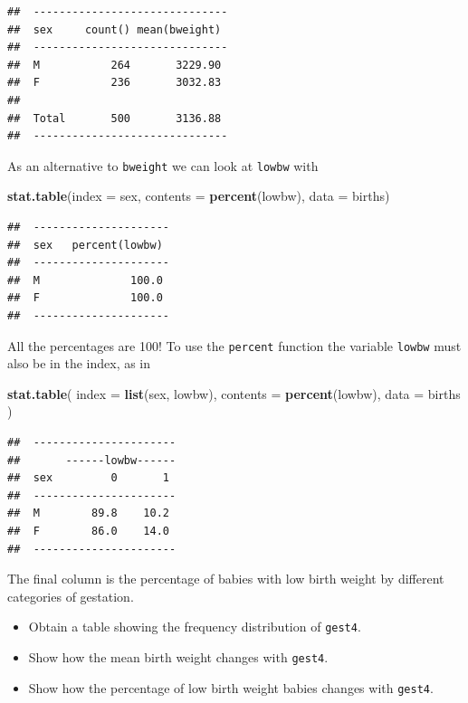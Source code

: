 \documentclass[
]{book}
\newenvironment{Shaded}{\begin{snugshade}}{\end{snugshade}}
\newcommand{\AttributeTok}[1]{\textcolor[rgb]{0.13,0.29,0.53}{#1}}
\newcommand{\FunctionTok}[1]{\textcolor[rgb]{0.13,0.29,0.53}{\textbf{#1}}}
\newcommand{\NormalTok}[1]{#1}
\providecommand{\tightlist}{%
  \setlength{\itemsep}{0pt}\setlength{\parskip}{0pt}}
\theoremstyle{definition}
\theoremstyle{definition}
\theoremstyle{definition}
\theoremstyle{definition}
\theoremstyle{remark}
\begin{document}
\begin{verbatim}
##  ------------------------------ 
##  sex     count() mean(bweight)  
##  ------------------------------ 
##  M           264       3229.90  
##  F           236       3032.83  
##                                 
##  Total       500       3136.88  
##  ------------------------------
\end{verbatim}

As an alternative to \texttt{bweight} we can look at \texttt{lowbw} with

\begin{Shaded}
\begin{Highlighting}[]
\FunctionTok{stat.table}\NormalTok{(}\AttributeTok{index =}\NormalTok{ sex, }\AttributeTok{contents =} \FunctionTok{percent}\NormalTok{(lowbw), }\AttributeTok{data =}\NormalTok{ births)}
\end{Highlighting}
\end{Shaded}

\begin{verbatim}
##  --------------------- 
##  sex   percent(lowbw)  
##  --------------------- 
##  M              100.0  
##  F              100.0  
##  ---------------------
\end{verbatim}

All the percentages are 100! To use the \texttt{percent} function the variable \texttt{lowbw} must also be in the index, as in

\begin{Shaded}
\begin{Highlighting}[]
\FunctionTok{stat.table}\NormalTok{(}
  \AttributeTok{index =} \FunctionTok{list}\NormalTok{(sex, lowbw), }
  \AttributeTok{contents =} \FunctionTok{percent}\NormalTok{(lowbw), }
  \AttributeTok{data =}\NormalTok{ births}
\NormalTok{)}
\end{Highlighting}
\end{Shaded}

\begin{verbatim}
##  ---------------------- 
##       ------lowbw------ 
##  sex         0       1  
##  ---------------------- 
##  M        89.8    10.2  
##  F        86.0    14.0  
##  ----------------------
\end{verbatim}

The final column is the percentage of babies with low birth weight by different categories of gestation.

\begin{itemize}
\tightlist
\item
  Obtain a table showing the frequency distribution of \texttt{gest4}.
\item
  Show how the mean birth weight changes with \texttt{gest4}.
\item
  Show how the percentage of low birth weight babies changes with \texttt{gest4}.
\end{itemize}
\end{document}
